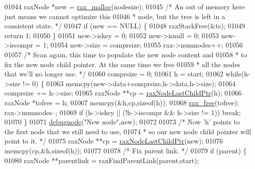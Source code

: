 \begin{DoxyCode}
{{{{{{{{{{{{{{{{{01044             raxNode *\textcolor{keyword}{new} = \hyperlink{rax__malloc_8h_aba4b5d6a50f54903fe9c330308beb66a}{rax\_malloc}(nodesize);
01045             \textcolor{comment}{/* An out of memory here just means we cannot optimize this}
01046 \textcolor{comment}{             * node, but the tree is left in a consistent state. */}
01047             \textcolor{keywordflow}{if} (\textcolor{keyword}{new} == NULL) \{
01048                 raxStackFree(&ts);
01049                 \textcolor{keywordflow}{return} 1;
01050             \}
01051             \textcolor{keyword}{new}->iskey = 0;
01052             \textcolor{keyword}{new}->isnull = 0;
01053             \textcolor{keyword}{new}->iscompr = 1;
01054             \textcolor{keyword}{new}->size = comprsize;
01055             rax->numnodes++;
01056 
01057             \textcolor{comment}{/* Scan again, this time to populate the new node content and}
01058 \textcolor{comment}{             * to fix the new node child pointer. At the same time we free}
01059 \textcolor{comment}{             * all the nodes that we'll no longer use. */}
01060             comprsize = 0;
01061             h = start;
01062             \textcolor{keywordflow}{while}(h->size != 0) \{
01063                 memcpy(\textcolor{keyword}{new}->data+comprsize,h->data,h->size);
01064                 comprsize += h->size;
01065                 raxNode **cp = \hyperlink{rax_8c_a2c5310b0d00672508a8f935a7109f4ce}{raxNodeLastChildPtr}(h);
01066                 raxNode *tofree = h;
01067                 memcpy(&h,cp,\textcolor{keyword}{sizeof}(h));
01068                 \hyperlink{rax__malloc_8h_a3adfa16bca6cd23b6e125fd441465e49}{rax\_free}(tofree); rax->numnodes--;
01069                 \textcolor{keywordflow}{if} (h->iskey || (!h->iscompr && h->size != 1)) \textcolor{keywordflow}{break};
01070             \}
01071             \hyperlink{rax_8c_a622b73fbdc398cdbfa8cc1fb87283cb4}{debugnode}(\textcolor{stringliteral}{"New node"},\textcolor{keyword}{new});
01072 
01073             \textcolor{comment}{/* Now 'h' points to the first node that we still need to use,}
01074 \textcolor{comment}{             * so our new node child pointer will point to it. */}
01075             raxNode **cp = \hyperlink{rax_8c_a2c5310b0d00672508a8f935a7109f4ce}{raxNodeLastChildPtr}(\textcolor{keyword}{new});
01076             memcpy(cp,&h,\textcolor{keyword}{sizeof}(h));
01077 
01078             \textcolor{comment}{/* Fix parent link. */}
01079             \textcolor{keywordflow}{if} (parent) \{
01080                 raxNode **parentlink = raxFindParentLink(parent,start);
}}}}}}}}}}}}}}}}}
\end{DoxyCode}
